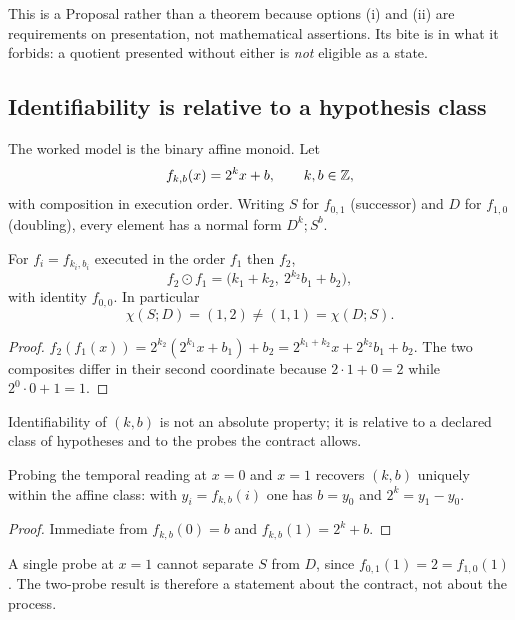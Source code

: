 This is a \textsf{Proposal} rather than a theorem because options (i) and (ii) are
requirements on presentation, not mathematical assertions.  Its bite is in what it
forbids: a quotient presented without either is \emph{not} eligible as a state.

\subsection{Identifiability is relative to a hypothesis class}

The worked model is the binary affine monoid.  Let
\[
  f_{k,b}(x)=2^{k}x+b,\qquad k,b\in\mathbb{Z},
\]
with composition in execution order.  Writing $S$ for $f_{0,1}$ (successor) and $D$
for $f_{1,0}$ (doubling), every element has a normal form $D^{k};S^{b}$.

\begin{lemma}\label{lem:affine-product}
For $f_{i}=f_{k_i,b_i}$ executed in the order $f_1$ then $f_2$,
\[
  f_2\odot f_1
  =\bigl(k_1+k_2,\ 2^{k_2}b_1+b_2\bigr),
\]
with identity $f_{0,0}$.  In particular
\[
  \chi(S;D)=(1,2)\neq(1,1)=\chi(D;S).
\]
\end{lemma}

\begin{proof}
$f_2(f_1(x))=2^{k_2}(2^{k_1}x+b_1)+b_2=2^{k_1+k_2}x+2^{k_2}b_1+b_2$.  The two
composites differ in their second coordinate because $2\cdot1+0=2$ while
$2^{0}\cdot 0+1=1$.
\end{proof}

Identifiability of $(k,b)$ is not an absolute property; it is relative to a declared
class of hypotheses and to the probes the contract allows.

\begin{proposition}\label{prop:two-probe}
Probing the temporal reading at $x=0$ and $x=1$ recovers $(k,b)$ uniquely within the
affine class: with $y_i=f_{k,b}(i)$ one has $b=y_0$ and $2^{k}=y_1-y_0$.
\end{proposition}

\begin{proof}
Immediate from $f_{k,b}(0)=b$ and $f_{k,b}(1)=2^{k}+b$.
\end{proof}

\begin{remark}\label{rem:one-probe}
A single probe at $x=1$ cannot separate $S$ from $D$, since $f_{0,1}(1)=2=f_{1,0}(1)$.
The two-probe result is therefore a statement about the contract, not about the
process.
\end{remark}

